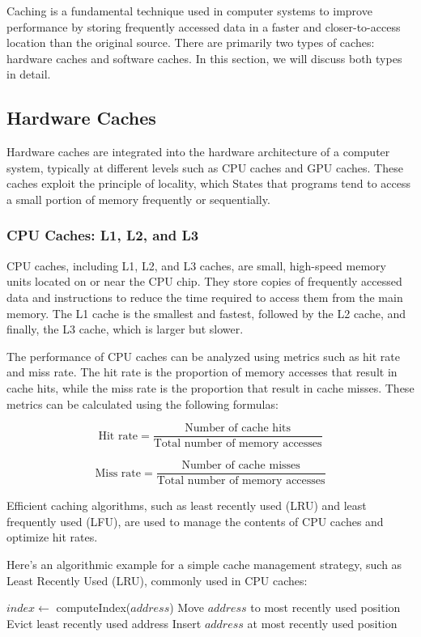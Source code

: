 \documentclass[12pt]{book} %
\begin{document}
Caching is a fundamental technique used in computer systems to improve performance by storing frequently accessed data in a faster and closer-to-access location than the original source. There are primarily two types of caches: hardware caches and software caches. In this section, we will discuss both types in detail.

\subsection{Hardware Caches}

Hardware caches are integrated into the hardware architecture of a computer system, typically at different levels such as CPU caches and GPU caches. These caches exploit the principle of locality, which States that programs tend to access a small portion of memory frequently or sequentially.

\subsubsection{CPU Caches: L1, L2, and L3}

CPU caches, including L1, L2, and L3 caches, are small, high-speed memory units located on or near the CPU chip. They store copies of frequently accessed data and instructions to reduce the time required to access them from the main memory. The L1 cache is the smallest and fastest, followed by the L2 cache, and finally, the L3 cache, which is larger but slower.

The performance of CPU caches can be analyzed using metrics such as hit rate and miss rate. The hit rate is the proportion of memory accesses that result in cache hits, while the miss rate is the proportion that result in cache misses. These metrics can be calculated using the following formulas:

\[
\text{Hit rate} = \frac{\text{Number of cache hits}}{\text{Total number of memory accesses}}
\]

\[
\text{Miss rate} = \frac{\text{Number of cache misses}}{\text{Total number of memory accesses}}
\]

Efficient caching algorithms, such as least recently used (LRU) and least frequently used (LFU), are used to manage the contents of CPU caches and optimize hit rates.

Here's an algorithmic example for a simple cache management strategy, such as Least Recently Used (LRU), commonly used in CPU caches:
\FloatBarrier
\begin{algorithm}[H]
\caption{Least Recently Used (LRU) Cache Management}
\begin{algorithmic}[1]
\State $index \gets$ computeIndex($address$)
    \State Move $address$ to most recently used position
\Else
        \State Evict least recently used address
    \EndIf
    \State Insert $address$ at most recently used position
\EndIf
\EndFunction
\end{algorithmic}
\end{algorithm}
\end{document}
